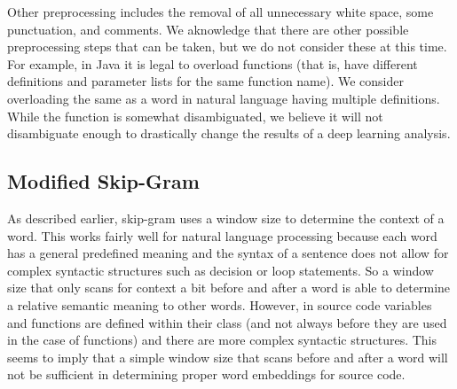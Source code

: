 Other preprocessing includes the removal of all unnecessary white space, some punctuation, and comments. We aknowledge that there are other possible preprocessing steps that can be taken, but we do not consider these at this time. For example, in Java it is legal to overload functions (that is, have different definitions and parameter lists for the same function name). We consider overloading the same as a word in natural language having multiple definitions. While the function is somewhat disambiguated, we believe it will not disambiguate enough to drastically change the results of a deep learning analysis.

\subsection{Modified Skip-Gram}

As described earlier, skip-gram uses a window size to determine the context of a word. This works fairly well for natural language processing because each word has a general predefined meaning and the syntax of a sentence does not allow for complex syntactic structures such as decision or loop statements. So a window size that only scans for context a bit before and after a word is able to determine a relative semantic meaning to other words. However, in source code variables and functions are defined within their class (and not always before they are used in the case of functions) and there are more complex syntactic structures. This seems to imply that a simple window size that scans before and after a word will not be sufficient in determining proper word embeddings for source code.

